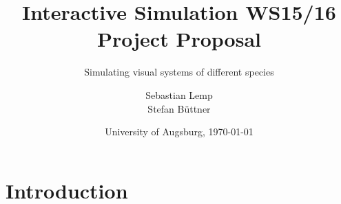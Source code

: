 \documentclass{acm_proc_article-sp}
\begin{document}
\title{
Interactive Simulation WS15/16\\ %
Project Proposal
}
\subtitle{Simulating visual systems of different species}
\author{
\alignauthor
Sebastian Lemp \\
\alignauthor
Stefan Büttner\\
}

\date{University of Augsburg, \today}





\maketitle
\begin{abstract}
\blindtext
\end{abstract}



\section{Introduction}
\blindtext
\end{document}
